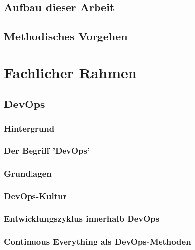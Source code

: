 \documentclass[12pt,titlepage]{article}
\begin{document}
\subsection{Aufbau dieser Arbeit}


\subsection{Methodisches Vorgehen}


\section{Fachlicher Rahmen}


\subsection{DevOps}


\subsubsection{Hintergrund}


\subsubsection{Der Begriff 'DevOps'}


\subsubsection{Grundlagen}


\subsubsection{DevOps-Kultur}


\subsubsection{Entwicklungszyklus innerhalb DevOps}


\subsubsection{Continuous Everything als DevOps-Methoden}

\end{document}
